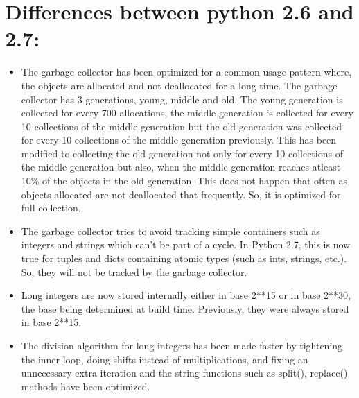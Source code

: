 \documentclass[letterpaper,10pt,dutch]{sphinxmanual}
\begin{document}
\section{Differences between python 2.6 and 2.7:}
\label{index:differences-between-python-2-6-and-2-7}\begin{itemize}
\item {} 
The garbage collector has been optimized for a common usage pattern where, the objects are allocated and not deallocated for a long time. The garbage collector has 3 generations, young, middle and old. The young generation is collected for every 700 allocations, the middle generation is collected for every 10 collections of the middle generation but the old generation was collected for every 10 collections of the middle generation previously. This has been modified to collecting the old generation not only for every 10 collections of the middle generation but also, when the middle generation reaches atleast 10\% of the objects in the old generation. This does not happen that often as objects allocated are not deallocated that frequently. So, it is optimized for full collection.

\item {} 
The garbage collector tries to avoid tracking simple containers such as integers and strings which can’t be part of a cycle. In Python 2.7, this is now true for tuples and dicts containing atomic types (such as ints, strings, etc.). So, they will not be tracked by the garbage collector.

\item {} 
Long integers are now stored internally either in base 2**15 or in base 2**30, the base being determined at build time. Previously, they were always stored in base 2**15.

\item {} 
The division algorithm for long integers has been made faster by tightening the inner loop, doing shifts instead of multiplications, and fixing an unnecessary extra iteration and the string functions such as split(), replace() methods have been optimized.

\end{itemize}
\end{document}
